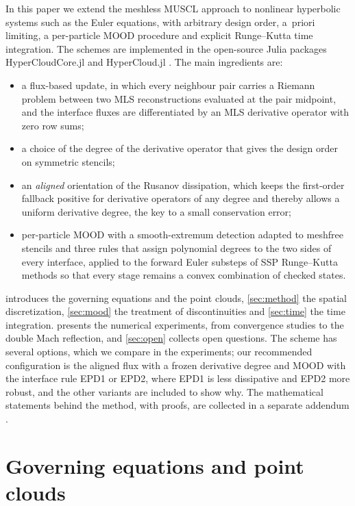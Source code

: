 \documentclass[smallextended]{svjour3}
\numberwithin{equation}{section}
\begin{document}
In this paper we extend the meshless MUSCL approach to nonlinear hyperbolic systems such as the Euler equations, with arbitrary design order, a~priori limiting, a per-particle MOOD procedure and explicit Runge--Kutta time integration. The schemes are implemented in the open-source Julia packages HyperCloudCore.jl and HyperCloud.jl \cite{jung_hypercloudcore,jung_hypercloud}. The main ingredients are:
\begin{itemize}
\item a flux-based update, in which every neighbour pair carries a Riemann problem between two MLS reconstructions evaluated at the pair midpoint, and the interface fluxes are differentiated by an MLS derivative operator with zero row sums;
\item a choice of the degree of the derivative operator that gives the design order on symmetric stencils;
\item an \emph{aligned} orientation of the Rusanov dissipation, which keeps the first-order fallback positive for derivative operators of any degree and thereby allows a uniform derivative degree, the key to a small conservation error;
\item per-particle MOOD with a smooth-extremum detection adapted to meshfree stencils and three rules that assign polynomial degrees to the two sides of every interface, applied to the forward Euler substeps of SSP Runge--Kutta methods so that every stage remains a convex combination of checked states.
\end{itemize}
 introduces the governing equations and the point clouds, \cref{sec:method} the spatial discretization, \cref{sec:mood} the treatment of discontinuities and \cref{sec:time} the time integration.  presents the numerical experiments, from convergence studies to the double Mach reflection, and \cref{sec:open} collects open questions. The scheme has several options, which we compare in the experiments; our recommended configuration is the aligned flux with a frozen derivative degree and MOOD with the interface rule EPD1 or EPD2, where EPD1 is less dissipative and EPD2 more robust, and the other variants are included to show why. The mathematical statements behind the method, with proofs, are collected in a separate addendum \cite{JungAddendum2026}.

\section{Governing equations and point clouds}\label{sec:setting}
\end{document}
